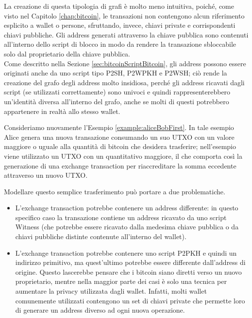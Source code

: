 La creazione di questa tipologia di grafi è molto meno intuitiva, poiché, come visto nel Capitolo \ref{chap:bitcoin}, le transazioni non contengono alcun riferimento esplicito a wallet o persone, sfruttando, invece, chiavi private e corrispondenti chiavi pubbliche. Gli address generati attraverso la chiave pubblica sono contenuti all’interno dello script di blocco in modo da rendere la transazione sbloccabile solo dal proprietario della chiave pubblica. \\
Come descritto nella Sezione \ref{sec:bitcoinScriptBitcoin}, gli address possono essere originati anche da uno script tipo P2SH, P2WPKH e P2WSH; ciò rende la creazione del grafo degli address molto insidiosa, perché gli address ricavati dagli script (se utilizzati correttamente) sono univoci e quindi rappresenterebbero un’identità diversa all’interno del grafo, anche se molti di questi potrebbero appartenere in realtà allo stesso wallet.

\begin{example}
Consideriamo nuovamente l’Esempio \ref{example:aliceBobFirst}. In tale esempio  Alice genera una nuova transazione consumando un suo UTXO con un valore maggiore o uguale alla quantità  di bitcoin che desidera trasferire; nell'esempio viene utilizzato un UTXO con un quantitativo maggiore, il che comporta così la generazione di una exchange transaction per riaccreditare la somma eccedente attraverso un nuovo UTXO.

Modellare questo semplice trasferimento può portare a due problematiche.

\begin{itemize}
  \item L’exchange transaction potrebbe contenere un address differente: in questo specifico caso la transazione contiene un address ricavato da uno script Witness (che potrebbe essere ricavato dalla medesima chiave pubblica o da chiavi pubbliche distinte contenute all’interno del wallet).

  \item L'exchange transaction potrebbe contenere uno script P2PKH e quindi un indirizzo primitivo, ma quest’ultimo potrebbe essere differente dall’address di origine. Questo lascerebbe pensare che i bitcoin  siano diretti verso un nuovo proprietario, mentre nella maggior parte dei casi è solo una tecnica per aumentare la privacy utilizzata dagli wallet.
Infatti, molti  wallet comunemente utilizzati contengono un set di chiavi private che permette loro di generare un address diverso ad ogni nuova operazione.
\end{itemize}

\end{example}

